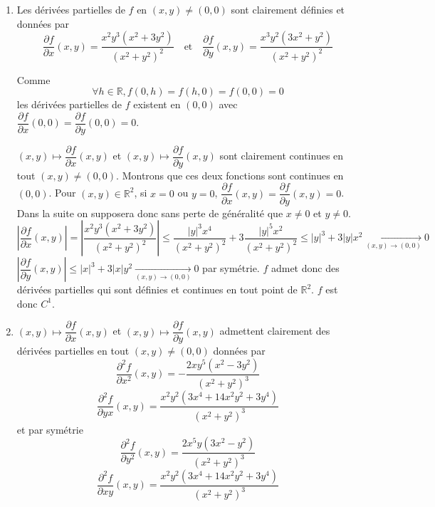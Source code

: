 \documentclass{fancybook}
\begin{document}
\begin{enumerate}
\item Les dérivées partielles de $f$ en $(x,y)\neq (0,0)$ sont clairement définies et données par 
\[
	\dfrac{\partial f}{\partial x}(x,y) =\dfrac{x^2 y^3 \left(x^2+3 y^2\right)}{\left(x^2+y^2\right)^2}
	\quad \text{et} \quad 
	\dfrac{\partial f}{\partial y}(x,y) = \dfrac{x^3 y^2 \left(3 x^2+y^2\right)}{\left(x^2+y^2\right)^2} 
\]

Comme 
\[
\forall h\in \mathbb R, f(0,h)=f(h,0)=f(0,0)=0
\] les dérivées partielles de $f$ existent en $(0,0)$ avec $\dfrac{\partial f}{\partial x}(0,0)=\dfrac{\partial f}{\partial y}(0,0)=0$.

$(x,y)\mapsto \dfrac{\partial f}{\partial x}(x,y)$ et $(x,y)\mapsto \dfrac{\partial f}{\partial y}(x,y)$ sont clairement continues en tout $(x,y)\neq (0,0)$.
Montrons que ces deux fonctions sont continues en $(0,0)$.\newline
Pour $(x,y)\in \mathbb R^2$, si $x=0$ ou $y=0$, $\dfrac{\partial f}{\partial x}(x,y)=\dfrac{\partial f}{\partial y}(x,y)=0$. Dans la suite on supposera donc sans perte de généralité que $x\neq 0$ et $y\neq 0$.\newline
$\left| \dfrac{\partial f}{\partial x}(x,y)\right| =\left|\dfrac{x^2 y^3 \left(x^2+3 y^2\right)}{\left(x^2+y^2\right)^2}\right|\leq \dfrac{|y|^3x^4}{(x^2+y^2)^2} + 3\dfrac{|y|^5x^2}{(x^2+y^2)^2}\leq |y|^3+3|y|x^2 \xrightarrow[(x,y)\to (0,0)]{}0$\newline
$\left| \dfrac{\partial f}{\partial y}(x,y)\right| \leq |x|^3+3|x|y^2 \xrightarrow[(x,y)\to (0,0)]{}0$ par symétrie.\newline
$f$ admet donc des dérivées partielles qui sont définies et continues en tout point de $\mathbb R^2$. $f$ est donc $C^1$. \newline
\newline
\item $(x,y)\mapsto \dfrac{\partial f}{\partial x}(x,y)$ et $(x,y)\mapsto \dfrac{\partial f}{\partial y}(x,y)$ admettent clairement des dérivées partielles en tout $(x,y)\neq (0,0)$ données par $$\dfrac{\partial^2 f}{\partial x^2}(x,y)=-\dfrac{2 x y^5 \left(x^2-3 y^2\right)}{\left(x^2+y^2\right)^3}$$ $$\dfrac{\partial^2 f}{\partial yx}(x,y)=\dfrac{x^2 y^2 \left(3 x^4+14 x^2 y^2+3 y^4\right)}{\left(x^2+y^2\right)^3}$$ et par symétrie $$\dfrac{\partial^2 f}{\partial y^2}(x,y)=\dfrac{2 x^5 y \left(3 x^2-y^2\right)}{\left(x^2+y^2\right)^3}$$ $$\dfrac{\partial^2 f}{\partial xy}(x,y)=\dfrac{x^2 y^2 \left(3 x^4+14 x^2 y^2+3 y^4\right)}{\left(x^2+y^2\right)^3}$$

\end{enumerate}
\end{document}
